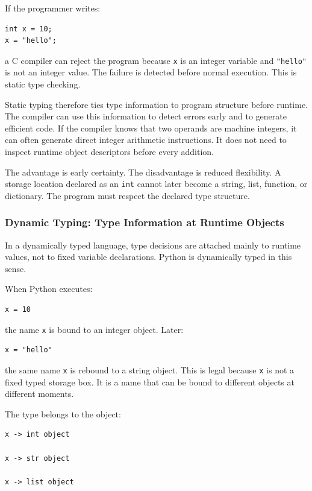 If the programmer writes:

\begin{verbatim}
int x = 10;
x = "hello";
\end{verbatim}

a C compiler can reject the program because \texttt{x} is an integer variable and \texttt{"hello"} is not an integer value. The failure is detected before normal execution. This is static type checking.

Static typing therefore ties type information to program structure before runtime. The compiler can use this information to detect errors early and to generate efficient code. If the compiler knows that two operands are machine integers, it can often generate direct integer arithmetic instructions. It does not need to inspect runtime object descriptors before every addition.

The advantage is early certainty. The disadvantage is reduced flexibility. A storage location declared as an \texttt{int} cannot later become a string, list, function, or dictionary. The program must respect the declared type structure.

\subsubsection*{Dynamic Typing: Type Information at Runtime Objects}

In a dynamically typed language, type decisions are attached mainly to runtime values, not to fixed variable declarations. Python is dynamically typed in this sense.

When Python executes:

\begin{verbatim}
x = 10
\end{verbatim}

the name \texttt{x} is bound to an integer object. Later:

\begin{verbatim}
x = "hello"
\end{verbatim}

the same name \texttt{x} is rebound to a string object. This is legal because \texttt{x} is not a fixed typed storage box. It is a name that can be bound to different objects at different moments.

The type belongs to the object:

\begin{verbatim}
x -> int object

x -> str object

x -> list object
\end{verbatim}

